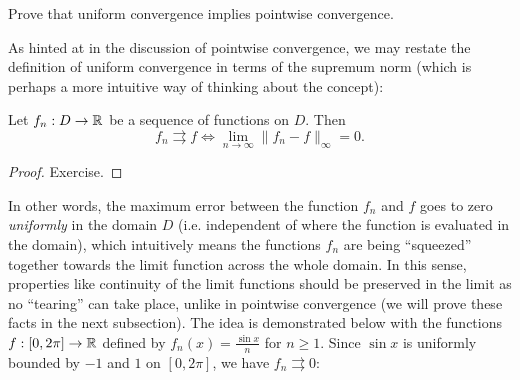 \documentclass[../analysis1.tex]{subfiles}
\begin{document}
\begin{exercise*}
    Prove that uniform convergence implies pointwise convergence.
\end{exercise*}
As hinted at in the discussion of pointwise convergence, we may restate the definition of uniform convergence in terms of the supremum norm (which is perhaps a more intuitive way of thinking about the concept):
\begin{lemma}
    \begin{shaded*}
        Let $f_n:D\to\mathbb{R}$ be a sequence of functions on $D$. Then
        \[f_n\rightrightarrows f \iff \lim_{n\to\infty}\|f_n-f\|_\infty = 0.\]
    \end{shaded*}
\end{lemma}
\begin{proof}
    Exercise.
\end{proof}
In other words, the maximum error between the function $f_n$ and $f$ goes to zero \textit{uniformly} in the domain $D$ (i.e. independent of where the function is evaluated in the domain), which intuitively means the functions $f_n$ are being ``squeezed'' together towards the limit function across the whole domain. In this sense, properties like continuity of the limit functions should be preserved in the limit as no ``tearing'' can take place, unlike in pointwise convergence (we will prove these facts in the next subsection). The idea is demonstrated below with the functions $f:[0,2\pi]\to\mathbb{R}$ defined by $f_n(x)=\frac{\sin x}{n}$ for $n\ge 1$. Since $\sin x$ is uniformly bounded by $-1$ and $1$ on $[0,2\pi]$, we have $f_n\rightrightarrows 0$: 
\end{document}

